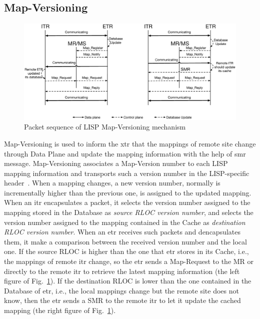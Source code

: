 \subsection{Map-Versioning}
\label{sec:MapVersionning}
\begin{figure}[!t]
	\centering
	\includegraphics[width=\textwidth]{Pics/Map_versioning_schema.eps}
	\caption{Packet sequence of LISP Map-Versioning mechanism}
	\label{Map_versioning_schema}
\end{figure}
Map-Versioning is used to inform the \acrshort{xtr} that the mappings of remote site change through Data Plane and update the mapping information with the help of \acrshort{smr} message. Map-Versioning associates a Map-Version number to each LISP mapping information and transports such a version number in the LISP-specific header~\cite{rfc6834}. When a mapping changes, a new version number, normally is incrementally higher than the previous one, is assigned to the updated mapping. When an \acrshort{itr} encapsulates a packet, it selects the version number assigned to the mapping stored in the Database as \emph{source RLOC version number}, and selects the version number assigned to the mapping contained in the Cache as \emph{destination RLOC version number}. When an \acrshort{etr} receives such packets and dencapsulates them, it make a comparison between the received version number and the local one. If the source RLOC is higher than the one that \acrshort{etr} stores in its Cache, i.e., the mappings of remote \acrshort{itr} change, so the \acrshort{etr} sends a Map-Request to the MR or directly to the remote \acrshort{itr} to retrieve the latest mapping information (the left figure of Fig.~\ref{Map_versioning_schema}). If the destination RLOC is lower than the one contained in the Database of \acrshort{etr}, i.e., the local mappings change but the remote site does not know, then the \acrshort{etr} sends a SMR to the remote \acrshort{itr} to let it update the cached mapping (the right figure of Fig.~\ref{Map_versioning_schema}).


